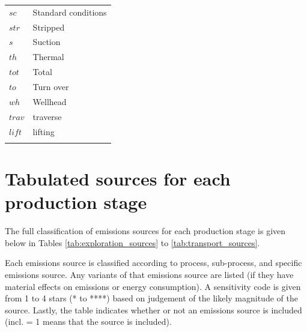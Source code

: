 \documentclass[11pt]{report}
\begin{document}
\begin{scriptsize}
\begin{supertabular*}{1\columnwidth}{p{0.2\columnwidth}p{0.75\columnwidth}}
$sc$ & Standard conditions\\
$str$ & Stripped\\
$s$ & Suction\\
$th$ & Thermal\\
$tot$ & Total\\
$to$ & Turn over\\
$wh$ & Wellhead\\
$trav$ & traverse\\
$lift$ & lifting\\
\\
\end{supertabular*}
\end{scriptsize}



\chapter{Tabulated sources for each production stage}\label{sec:app_sources_classification}

The full classification of emissions sources for each production stage is given below in Tables \ref{tab:exploration_sources} to \ref{tab:transport_sources}.

Each emissions source is classified according to process, sub-process, and specific emissions source. Any variants of that emissions source are listed (if they have material effects on emissions or energy consumption). A sensitivity code is given from 1 to 4 stars (* to ****) based on judgement of the likely magnitude of the source. Lastly, the table indicates whether or not an emissions source is included (incl. = 1 means that the source is included).
\end{document}

